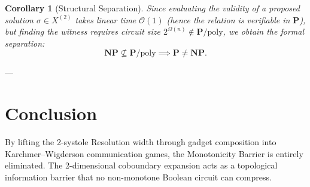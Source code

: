 \documentclass[11pt,a4paper]{article}
\theoremstyle{plain}
\newtheorem{corollary}[theorem]{Corollary}
\theoremstyle{definition}
\theoremstyle{remark}
\begin{document}
\begin{corollary}[Structural Separation]
Since evaluating the validity of a proposed solution $\sigma \in X^{(2)}$ takes linear time $\mathcal{O}(1)$ (hence the relation is verifiable in $\mathbf{P}$), but finding the witness requires circuit size $2^{\Omega(n)} \notin \mathbf{P}/\mathrm{poly}$, we obtain the formal separation:
\[
\mathbf{NP} \not\subseteq \mathbf{P}/\mathrm{poly} \implies \mathbf{P} \neq \mathbf{NP}.
\]
\end{corollary}

---

\section{Conclusion}

By lifting the 2-systole Resolution width through gadget composition into Karchmer--Wigderson communication games, the Monotonicity Barrier is entirely eliminated. The 2-dimensional coboundary expansion acts as a topological information barrier that no non-monotone Boolean circuit can compress.
\end{document}
